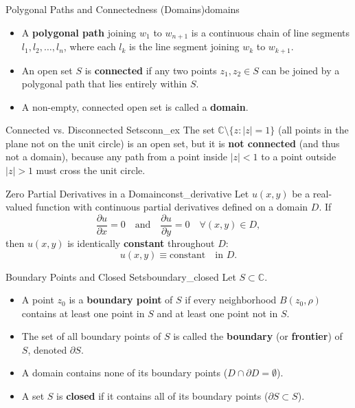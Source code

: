 \begin{definition}{Polygonal Paths and Connectedness (Domains)}{domains}
\begin{itemize}
    \item A \textbf{polygonal path} joining $w_1$ to $w_{n+1}$ is a continuous chain of line segments $l_1, l_2, \dots, l_n$, where each $l_k$ is the line segment joining $w_k$ to $w_{k+1}$.
    \item An open set $S$ is \textbf{connected} if any two points $z_1, z_2 \in S$ can be joined by a polygonal path that lies entirely within $S$.
    \item A non-empty, connected open set is called a \textbf{domain}.
\end{itemize}
\end{definition}

\begin{example}{Connected vs. Disconnected Sets}{conn_ex}
The set $\mathbb{C} \setminus \{z : |z| = 1\}$ (all points in the plane not on the unit circle) is an open set, but it is \textbf{not connected} (and thus not a domain), because any path from a point inside $|z|<1$ to a point outside $|z|>1$ must cross the unit circle.
\end{example}

\begin{theorem}{Zero Partial Derivatives in a Domain}{const_derivative}
Let $u(x, y)$ be a real-valued function with continuous partial derivatives defined on a domain $D$. If
\begin{equation}
\frac{\partial u}{\partial x} = 0 \quad \text{and} \quad \frac{\partial u}{\partial y} = 0 \quad \forall (x, y) \in D,
\end{equation}
then $u(x, y)$ is identically \textbf{constant} throughout $D$:
\begin{equation}
u(x, y) \equiv \text{constant} \quad \text{in } D.
\end{equation}
\end{theorem}

\begin{definition}{Boundary Points and Closed Sets}{boundary_closed}
Let $S \subset \mathbb{C}$.
\begin{itemize}
    \item A point $z_0$ is a \textbf{boundary point} of $S$ if every neighborhood $B(z_0, \rho)$ contains at least one point in $S$ and at least one point not in $S$.
    \item The set of all boundary points of $S$ is called the \textbf{boundary} (or \textbf{frontier}) of $S$, denoted $\partial S$.
    \item A domain contains none of its boundary points ($D \cap \partial D = \emptyset$).
    \item A set $S$ is \textbf{closed} if it contains all of its boundary points ($\partial S \subset S$).
\end{itemize}
\end{definition}

